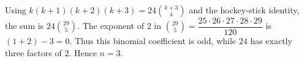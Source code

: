 Using $k(k+1)(k+2)(k+3)=24\binom{k+3}{4}$ and the hockey-stick identity, the sum is $24\binom{29}{5}$. The exponent of $2$ in $\binom{29}{5}=\dfrac{25\cdot26\cdot27\cdot28\cdot29}{120}$ is $(1+2)-3=0$. Thus this binomial coefficient is odd, while $24$ has exactly three factors of $2$. Hence $\boxed{n=3}$.
